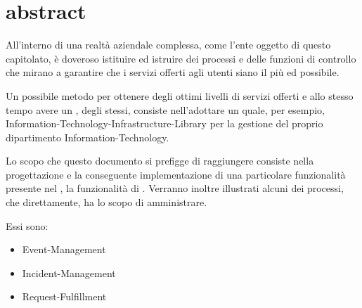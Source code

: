 %
%
\chapter[Abstract]{abstract}
\label{abs}
All'interno di una realtà aziendale complessa, come l'ente oggetto di questo capitolato, è doveroso istituire ed istruire dei processi e delle funzioni di controllo che mirano a garantire che i servizi offerti agli utenti siano il più  ed  possibile.

Un possibile metodo per ottenere degli ottimi livelli di servizi offerti e allo stesso tempo avere un , degli stessi, consiste nell'adottare un  quale, per esempio, \ac{Information-Technology-Infrastructure-Library} per la gestione del proprio dipartimento \acs{Information-Technology}.

Lo scopo che questo documento si prefigge di raggiungere consiste nella progettazione e la conseguente implementazione di una particolare funzionalità presente nel , la funzionalità di . Verranno inoltre illustrati alcuni dei processi, che direttamente, ha lo scopo di amministrare.

Essi sono: 

\begin{itemize}
\item{\acf{Event-Management}}
\item{\acf{Incident-Management}}
\item{\acf{Request-Fulfillment}}
\end{itemize}





